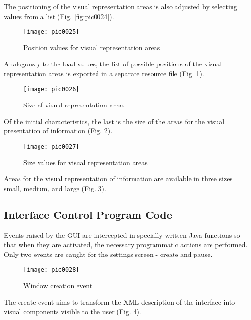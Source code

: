 The positioning of the visual representation areas is also adjusted by selecting values from a list (Fig. \ref{fig:pic0024}).

\begin{figure}[h]
\centering
\texttt{[image: pic0025]}
\caption{Position values for visual representation areas}
\label{fig:pic0025}
\end{figure}
\FloatBarrier

Analogously to the load values, the list of possible positions of the visual representation areas is exported in a separate resource file (Fig. \ref{fig:pic0025}).

\begin{figure}[h]
\centering
\texttt{[image: pic0026]}
\caption{Size of visual representation areas}
\label{fig:pic0026}
\end{figure}
\FloatBarrier

Of the initial characteristics, the last is the size of the areas for the visual presentation of information (Fig. \ref{fig:pic0026}).

\begin{figure}[h]
\centering
\texttt{[image: pic0027]}
\caption{Size values for visual representation areas}
\label{fig:pic0027}
\end{figure}
\FloatBarrier

Areas for the visual representation of information are available in three sizes small, medium, and large (Fig. \ref{fig:pic0027}).

\subsection{Interface Control Program Code}

Events raised by the GUI are intercepted in specially written Java functions so that when they are activated, the necessary programmatic actions are performed. Only two events are caught for the settings screen - create and pause.

\begin{figure}[h]
\centering
\texttt{[image: pic0028]}
\caption{Window creation event}
\label{fig:pic0028}
\end{figure}
\FloatBarrier

The create event aims to transform the XML description of the interface into visual components visible to the user (Fig. \ref{fig:pic0028}).

